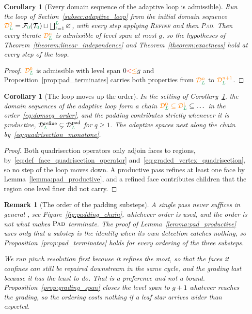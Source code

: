 \documentclass[a4paper, 12pt]{article}
\makeatletter
\newcommand{\robert}[1]{{\color{orange} #1}}
\newcommand{\green}{\color{ForestGreen}}
\newcommand{\T}{\mathcal{T}}
\newcommand{\F}{\mathcal{F}}
\renewcommand{\l}{{\green\ell}}
\renewcommand{\L}{{\green L}}
\newcommand{\lzero}{{\green 0}}
\newtheorem{corollary}[theorem]{Corollary}
\newtheorem{remark}[theorem]{Remark}
\theoremstyle{definition}
\theoremstyle{plain}
\numberwithin{equation}{section}
\newcommand{\tobecut}[1]{{\color{red} #1}}     %
\DeclareRobustCommand{\domseq}[1][]{\mathcal{D}\ifx\@empty#1\@empty\else_{#1}\fi}
\makeatother
\begin{document}
\begin{corollary}[Every domain sequence of the adaptive loop is admissible]
    \label{cor:adaptive_loop_admissible}
    Run the loop of Section~\ref{subsec:adaptive_loop} from the initial domain sequence $\robert{\domseq[\L]^0} = \F_\lzero(\T_\lzero) \sqcup \bigsqcup_{\l = 1}^{\L} \varnothing$, with every step applying \textsc{Refine} and then \textsc{Pad}. Then every iterate $\robert{\domseq[\L]^n}$ is admissible of level span at most $g$, so the hypotheses of Theorem~\ref{theorem:linear_independence} and Theorem~\ref{theorem:exactness} hold at every step of the loop.
\end{corollary}
\begin{proof}
    $\robert{\domseq[\L]^0}$ is admissible with level span $0 \tobecut{<} \robert{\leq} g$ and Proposition~\ref{prop:pad_terminates} carries both properties from $\robert{\domseq[\L]^n}$ to $\robert{\domseq[\L]^{n+1}}$.
\end{proof}

\begin{corollary}[The loop moves up the order]
    \label{cor:adaptive_loop_chain}
    In the setting of Corollary~\ref{cor:adaptive_loop_admissible}, the domain sequences of the adaptive loop form a chain $\robert{\domseq[\L]^{0} \subseteq \domseq[\L]^{1}} \subseteq \dots$ in the order~\eqref{eq:domseq_order}, and the padding contributes strictly whenever it is productive, $\domseq[\L]^{\mathrm{refine}} \subsetneq \domseq[\L]^{\mathrm{pad}}$ for $q \geq 1$. The adaptive spaces nest along the chain by~\eqref{eq:quadrisection_monotone}.
\end{corollary}
\begin{proof}
    Both quadrisection operators only adjoin faces to regions, by~\eqref{eq:def_face_quadrisection_operator} and~\eqref{eq:graded_vertex_quadrisection}, so no step of the loop moves down. A productive pass refines at least one face by Lemma~\ref{lemma:pad_productive}, and a refined face contributes children that the region one level finer did not carry.
\end{proof}

\begin{remark}[The order of the padding substeps]
\label{rem:padding_order}
    A single pass never suffices in general\robert{, see Figure~\ref{fig:padding_chain}}, whichever order is used, and the order is not what makes $\textsc{Pad}$ terminate. The proof of Lemma~\ref{lemma:pad_productive} uses only that a substep is the identity when its own detection catches nothing, so Proposition~\ref{prop:pad_terminates} holds for every ordering of the three substeps.

    We run pinch resolution first because it refines the most, so that the faces it confines can still be repaired downstream in the same cycle, and the grading last because it has the least to do. That is a preference and not a bound.
    \tobecut{Proposition~\ref{prop:grading_span} closes the level span to $g \! + \! 1$ whatever reaches the grading, so the ordering costs nothing if a leaf star arrives wider than expected.}
\end{remark}
\end{document}

